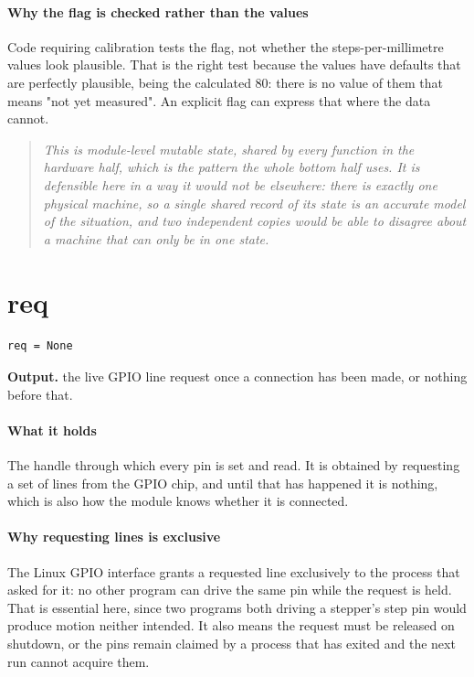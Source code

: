 \paragraph{Why the flag is checked rather than the values}
Code requiring calibration tests the flag, not whether the steps-per-millimetre values look plausible. That is the right test because the values have defaults that are perfectly plausible, being the calculated 80: there is no value of them that means "not yet measured". An explicit flag can express that where the data cannot.


\begin{quote}\small\itshape This is module-level mutable state, shared by every function in the hardware half, which is the pattern the whole bottom half uses. It is defensible here in a way it would not be elsewhere: there is exactly one physical machine, so a single shared record of its state is an accurate model of the situation, and two independent copies would be able to disagree about a machine that can only be in one state.\end{quote}

\section{req}
\begin{lstlisting}[style=sig]
req = None
\end{lstlisting}

\noindent\textbf{Output.} the live GPIO line request once a connection has been made, or nothing before that.


\paragraph{What it holds}
The handle through which every pin is set and read. It is obtained by requesting a set of lines from the GPIO chip, and until that has happened it is nothing, which is also how the module knows whether it is connected.


\paragraph{Why requesting lines is exclusive}
The Linux GPIO interface grants a requested line exclusively to the process that asked for it: no other program can drive the same pin while the request is held. That is essential here, since two programs both driving a stepper's step pin would produce motion neither intended. It also means the request must be released on shutdown, or the pins remain claimed by a process that has exited and the next run cannot acquire them.


